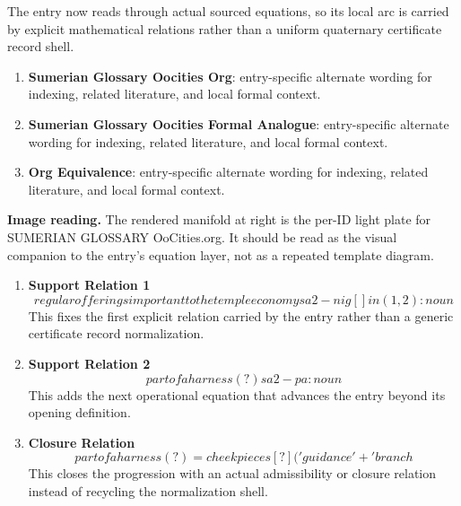 The entry now reads through actual sourced equations, so its local arc is carried by explicit mathematical relations rather than a uniform quaternary certificate record shell.
\endgroup

\begin{enumerate}[leftmargin=1.6em,itemsep=6pt,topsep=4pt]
\item \textbf{Sumerian Glossary Oocities Org}: entry-specific alternate wording for indexing, related literature, and local formal context.
\item \textbf{Sumerian Glossary Oocities Formal Analogue}: entry-specific alternate wording for indexing, related literature, and local formal context.
\item \textbf{Org Equivalence}: entry-specific alternate wording for indexing, related literature, and local formal context.
\end{enumerate}

\begin{samepage}
\noindent\begin{minipage}[t]{0.45\linewidth}
\vspace{0pt}
\raggedright
\scriptsize\textbf{Image reading.} The rendered manifold at right is the per-ID light plate for SUMERIAN GLOSSARY OoCities.org. It should be read as the visual companion to the entry's equation layer, not as a repeated template diagram.\par
\end{minipage}\hfill
\begin{minipage}[t]{0.53\linewidth}
\vspace*{-0.10in}
\raggedright
{}
\end{minipage}
\end{samepage}

\clearpage


\begin{enumerate}[leftmargin=1.6em,itemsep=9pt,topsep=6pt]
\item \textbf{Support Relation 1}
\[
regular offerings important to the temple economy sa2-nig[ ]in(1,2): noun
\]
This fixes the first explicit relation carried by the entry rather than a generic certificate record normalization.

\item \textbf{Support Relation 2}
\[
part of a harness (?) sa2 -pa : noun
\]
This adds the next operational equation that advances the entry beyond its opening definition.

\item \textbf{Closure Relation}
\[
part of a harness (?) = cheekpieces [?] ('guidance' + 'branch
\]
This closes the progression with an actual admissibility or closure relation instead of recycling the normalization shell.
\end{enumerate}

